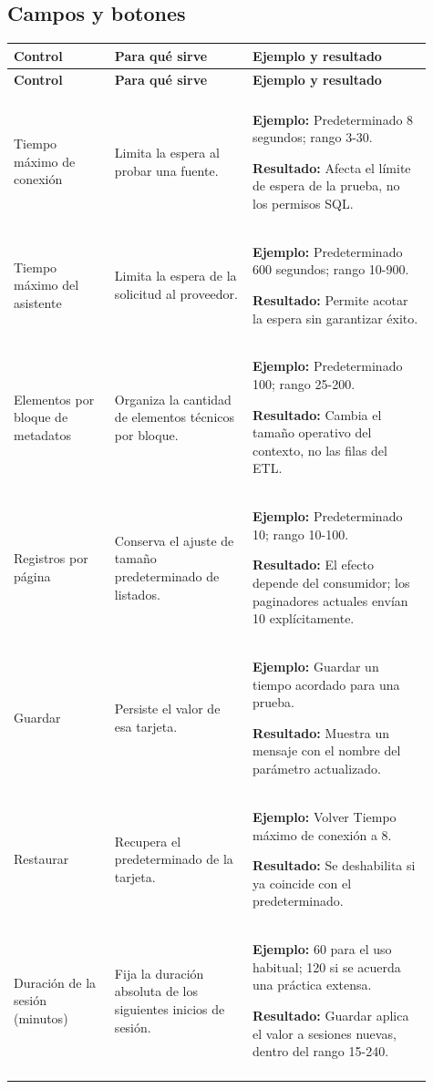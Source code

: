 \subsection{Campos y botones}
\begingroup
\fontsize{10}{12.5}\selectfont
\setlength{\tabcolsep}{5pt}
\renewcommand{\arraystretch}{1.15}
\begin{longtable}{@{}>{\RaggedRight\arraybackslash}p{0.22\linewidth}>{\RaggedRight\arraybackslash}p{0.3\linewidth}>{\RaggedRight\arraybackslash}p{0.39\linewidth}@{}}
\toprule
\textbf{Control} & \textbf{Para qué sirve} & \textbf{Ejemplo y resultado} \\
\midrule
\endfirsthead
\toprule
\textbf{Control} & \textbf{Para qué sirve} & \textbf{Ejemplo y resultado} \\
\midrule
\endhead
\midrule
\multicolumn{3}{r}{\footnotesize Continúa en la página siguiente}\\
\endfoot
\bottomrule
\endlastfoot
Tiempo máximo de conexión & Limita la espera al probar una fuente. & \textbf{Ejemplo:} Predeterminado 8 segundos; rango 3-30.\par\smallskip\textbf{Resultado:} Afecta el límite de espera de la prueba, no los permisos SQL. \\
\addlinespace[3pt]
Tiempo máximo del asistente & Limita la espera de la solicitud al proveedor. & \textbf{Ejemplo:} Predeterminado 600 segundos; rango 10-900.\par\smallskip\textbf{Resultado:} Permite acotar la espera sin garantizar éxito. \\
\addlinespace[3pt]
Elementos por bloque de metadatos & Organiza la cantidad de elementos técnicos por bloque. & \textbf{Ejemplo:} Predeterminado 100; rango 25-200.\par\smallskip\textbf{Resultado:} Cambia el tamaño operativo del contexto, no las filas del ETL. \\
\addlinespace[3pt]
Registros por página & Conserva el ajuste de tamaño predeterminado de listados. & \textbf{Ejemplo:} Predeterminado 10; rango 10-100.\par\smallskip\textbf{Resultado:} El efecto depende del consumidor; los paginadores actuales envían 10 explícitamente. \\
\addlinespace[3pt]
Guardar & Persiste el valor de esa tarjeta. & \textbf{Ejemplo:} Guardar un tiempo acordado para una prueba.\par\smallskip\textbf{Resultado:} Muestra un mensaje con el nombre del parámetro actualizado. \\
\addlinespace[3pt]
Restaurar & Recupera el predeterminado de la tarjeta. & \textbf{Ejemplo:} Volver Tiempo máximo de conexión a 8.\par\smallskip\textbf{Resultado:} Se deshabilita si ya coincide con el predeterminado. \\
\addlinespace[3pt]
Duración de la sesión (minutos) & Fija la duración absoluta de los siguientes inicios de sesión. & \textbf{Ejemplo:} 60 para el uso habitual; 120 si se acuerda una práctica extensa.\par\smallskip\textbf{Resultado:} Guardar aplica el valor a sesiones nuevas, dentro del rango 15-240. \\
\addlinespace[3pt]
\end{longtable}
\endgroup

